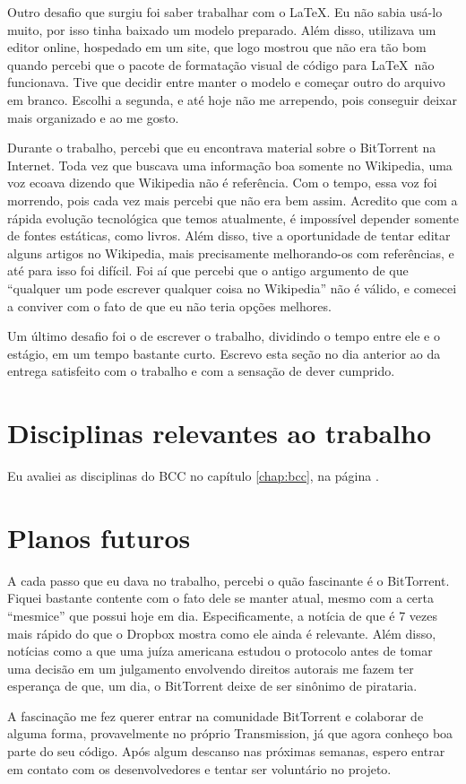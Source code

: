 Outro desafio que surgiu foi saber trabalhar com o \LaTeX. Eu não sabia usá-lo muito,
por isso tinha baixado um modelo preparado. Além disso, utilizava um editor online,
hospedado em um site, que logo mostrou que não era tão bom quando percebi que o pacote
de formatação visual de código para \LaTeX\, não funcionava. Tive que decidir entre
manter o modelo e começar outro do arquivo em branco. Escolhi a segunda, e até hoje não
me arrependo, pois conseguir deixar mais organizado e ao me gosto.

Durante o trabalho, percebi que eu encontrava material sobre o BitTorrent na Internet.
Toda vez que buscava uma informação boa somente no Wikipedia, uma voz ecoava dizendo que
Wikipedia não é referência. Com o tempo, essa voz foi morrendo, pois cada vez mais
percebi que não era bem assim. Acredito que com a rápida evolução tecnológica que temos
atualmente, é impossível depender somente de fontes estáticas, como livros. Além disso,
tive a oportunidade de tentar editar alguns artigos no Wikipedia, mais precisamente
melhorando-os com referências, e até para isso foi difícil. Foi aí que percebi que o
antigo argumento de que ``qualquer um pode escrever qualquer coisa no Wikipedia'' não é
válido, e comecei a conviver com o fato de que eu não teria opções melhores.

Um último desafio foi o de escrever o trabalho, dividindo o tempo entre ele e o
estágio, em um tempo bastante curto. Escrevo esta seção no dia anterior ao da entrega
satisfeito com o trabalho e com a sensação de dever cumprido.

\section*{Disciplinas relevantes ao trabalho}

Eu avaliei as disciplinas do BCC no capítulo \ref{chap:bcc}, na página \pageref{chap:bcc}.

\section*{Planos futuros}

A cada passo que eu dava no trabalho, percebi o quão fascinante é o BitTorrent. Fiquei
bastante contente com o fato dele se manter atual, mesmo com a certa ``mesmice'' que
possui hoje em dia. Especificamente, a notícia de que é 7 vezes mais rápido do que o
Dropbox \cite{site:torrentvsdropbox} mostra como ele ainda é relevante. Além disso,
notícias como a que uma juíza americana estudou o protocolo antes de tomar uma decisão
em um julgamento envolvendo direitos autorais \cite{site:juizamanjona} me fazem ter
esperança de que, um dia, o BitTorrent deixe de ser sinônimo de pirataria.

A fascinação me fez querer entrar na comunidade BitTorrent e colaborar de alguma
forma, provavelmente no próprio Transmission, já que agora conheço boa parte do seu
código. Após algum descanso nas próximas semanas, espero entrar em contato com os
desenvolvedores e tentar ser voluntário no projeto.

\afterpage{\clearpage}